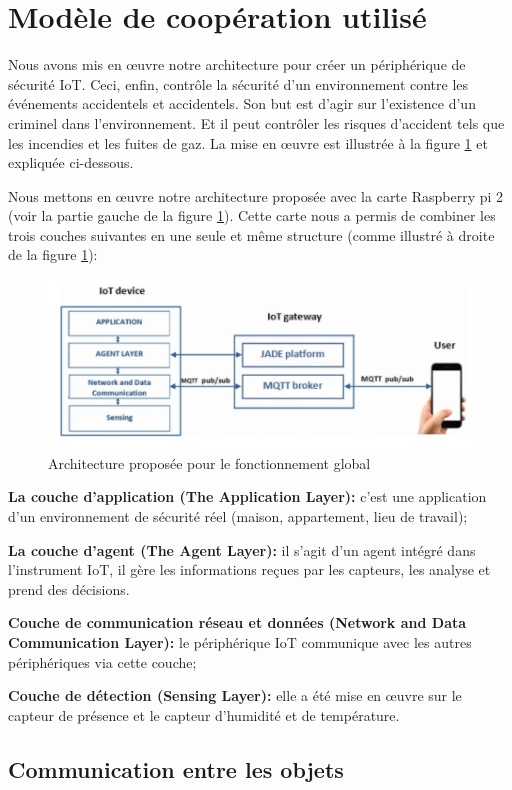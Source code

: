 \section{Modèle de coopération utilisé}
Nous avons mis en œuvre notre architecture pour créer un périphérique de sécurité IoT. Ceci, enfin, contrôle la sécurité d'un environnement contre les événements accidentels et accidentels. Son but est d'agir sur l'existence d'un criminel dans l'environnement. Et il peut contrôler les risques d'accident tels que les incendies et les fuites de gaz. La mise en œuvre est illustrée à la figure \ref{fc16} et expliquée ci-dessous.


Nous mettons en œuvre notre architecture proposée avec la carte Raspberry pi 2 (voir la partie gauche de la figure \ref{fc16}). Cette carte nous a permis de combiner les trois couches suivantes en une seule et même structure (comme illustré à droite de la figure  \ref{fc16}):
\begin{figure}[H]
\centering
\includegraphics[scale=1.2]{chap1/fc16.png}
\caption{Architecture proposée pour le fonctionnement global}
\label{fc16}
\end{figure}


\textbf{La couche d'application (The Application Layer):} c'est une application d'un environnement de sécurité réel (maison, appartement, lieu de travail);


\textbf{La couche d'agent (The Agent Layer):} il s’agit d’un agent intégré dans l’instrument IoT, il gère les informations reçues par les capteurs, les analyse et prend des décisions.


\textbf{Couche de communication réseau et données (Network and Data Communication Layer):} le périphérique IoT communique avec les autres périphériques via cette couche;


\textbf{Couche de détection (Sensing Layer):} elle a été mise en œuvre sur le capteur de présence et le capteur d'humidité et de température.

\subsection{Communication entre les objets}

